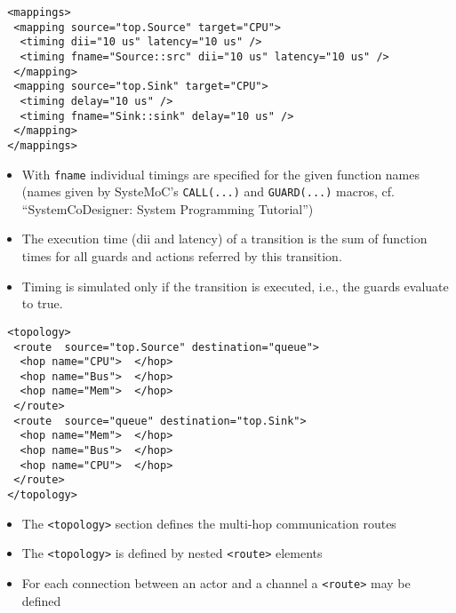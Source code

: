 \begin{frame}[fragile=singleslide]
\begin{lstlisting}
 <mappings>
  <mapping source="top.Source" target="CPU">
   <timing dii="10 us" latency="10 us" />
   <timing fname="Source::src" dii="10 us" latency="10 us" />
  </mapping>
  <mapping source="top.Sink" target="CPU">
   <timing delay="10 us" />
   <timing fname="Sink::sink" delay="10 us" />
  </mapping>
 </mappings>
\end{lstlisting}
\begin{itemize}
\item With \lstinline!fname! individual timings are specified for the given function names (names given by SysteMoC's \lstinline!CALL(...)! and \lstinline!GUARD(...)! macros, cf. ``SystemCoDesigner: System Programming Tutorial'')
\item The execution time (dii and latency) of a transition is the sum of function times for all guards and actions referred by this transition.
\item Timing is simulated only if the transition is executed, i.e., the guards evaluate to true.
\end{itemize}
\vfill
\end{frame}


\begin{frame}[fragile=singleslide]
\begin{lstlisting}
 <topology>
  <route  source="top.Source" destination="queue">
   <hop name="CPU">  </hop>
   <hop name="Bus">  </hop>
   <hop name="Mem">  </hop>
  </route>
  <route  source="queue" destination="top.Sink">
   <hop name="Mem">  </hop>
   <hop name="Bus">  </hop>
   <hop name="CPU">  </hop>
  </route>
 </topology>
\end{lstlisting}
\begin{itemize}
\item The  \lstinline!<topology>! section defines the multi-hop communication routes
\item The \lstinline!<topology>! is defined by nested \lstinline!<route>! elements
\item For each connection between an actor and a channel a  \lstinline!<route>! may be defined
\end{itemize}
\end{frame}


